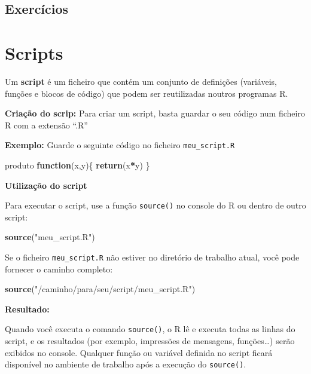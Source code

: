 \documentclass[
]{book}
\newenvironment{Shaded}{\begin{snugshade}}{\end{snugshade}}
\newcommand{\ControlFlowTok}[1]{\textcolor[rgb]{0.13,0.29,0.53}{\textbf{#1}}}
\newcommand{\FunctionTok}[1]{\textcolor[rgb]{0.13,0.29,0.53}{\textbf{#1}}}
\newcommand{\NormalTok}[1]{#1}
\newcommand{\SpecialCharTok}[1]{\textcolor[rgb]{0.81,0.36,0.00}{\textbf{#1}}}
\newcommand{\StringTok}[1]{\textcolor[rgb]{0.31,0.60,0.02}{#1}}
\begin{document}
\section{Exercícios}\label{exercuxedcios-5}

\chapter{Scripts}\label{scripts}

Um \textbf{script} é um ficheiro que contém um conjunto de definições (variáveis, funções e blocos de código) que podem ser reutilizadas noutros programas R.

\textbf{Criação do scrip:}
Para criar um script, basta guardar o seu código num ficheiro R com a extensão ``.R''

\textbf{Exemplo:} Guarde o seguinte código no ficheiro \texttt{meu\_script.R}

\begin{Shaded}
\begin{Highlighting}[]
\NormalTok{produto }\ControlFlowTok{function}\NormalTok{(x,y)\{}
  \FunctionTok{return}\NormalTok{(x}\SpecialCharTok{*}\NormalTok{y)}
\NormalTok{\}}
\end{Highlighting}
\end{Shaded}

\textbf{Utilização do script}

Para executar o script, use a função \texttt{source()} no console do R ou dentro de outro script:

\begin{Shaded}
\begin{Highlighting}[]
\FunctionTok{source}\NormalTok{(}\StringTok{"meu\_script.R"}\NormalTok{)}
\end{Highlighting}
\end{Shaded}

Se o ficheiro \texttt{meu\_script.R} não estiver no diretório de trabalho atual, você pode fornecer o caminho completo:

\begin{Shaded}
\begin{Highlighting}[]
\FunctionTok{source}\NormalTok{(}\StringTok{"/caminho/para/seu/script/meu\_script.R"}\NormalTok{)}
\end{Highlighting}
\end{Shaded}

\textbf{Resultado:}

Quando você executa o comando \texttt{source()}, o R lê e executa todas as linhas do script, e os resultados (por exemplo, impressões de mensagens, funções\ldots) serão exibidos no console. Qualquer função ou variável definida no script ficará disponível no ambiente de trabalho após a execução do \texttt{source()}.
\end{document}

